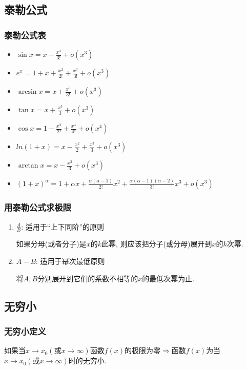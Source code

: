 \subsection{泰勒公式}
\subsubsection{泰勒公式表}
\begin{multicols}{2}
    \begin{itemize}
        \item $ \sin x=x-\frac{x^{3}}{3!}+o(x^{3}) $
        \item $ e^{x}=1+x+\frac{x^{2}}{2!}+\frac{x^{3}}{3!}+o(x^{3}) $
        \item $ \arcsin x=x+\frac{x^{3}}{3!}+o(x^{3}) $
        \item $ \tan x=x+\frac{x^{3}}{3}+o(x^{3}) $
        \item $ \cos x=1-\frac{x^{2}}{2!}+\frac{x^{4}}{4!}+o(x^{4}) $
        \item $ ln(1+x)=x-\frac{x^{2}}{2}+\frac{x^{3}}{3}+o(x^{3}) $
        \item $ \arctan x=x-\frac{x^{3}}{3}+o(x^{3}) $
        \item $ (1+x)^{\alpha}=1+\alpha x+\frac{\alpha (\alpha -1)}{2!}x^{2}+\frac{\alpha (\alpha -1)(\alpha -2)}{3!}x^{3}+o(x^{3}) $
    \end{itemize}
\end{multicols}
\subsubsection{用泰勒公式求极限}
\begin{enumerate}
    \item $ \frac{A}{B} $: 适用于``上下同阶''的原则 \par
          如果分母(或者分子)是$ x $的$ k $此幂, 则应该把分子(或分母)展开到$ x $的$ k $次幂.
    \item $ A-B $: 适用于幂次最低原则 \par
          将$ A, B $分别展开到它们的系数不相等的$ x $的最低次幂为止.
\end{enumerate}
\subsection{无穷小}
\subsubsection{无穷小定义}
如果当$ x\rightarrow x_{0}(\text{或}x\rightarrow \infty) $函数$ f(x) $的极限为零$ \Rightarrow  $函数$ f(x) $为当$ x \rightarrow x_{0}(\text{或}x \rightarrow \infty ) $时的无穷小.
